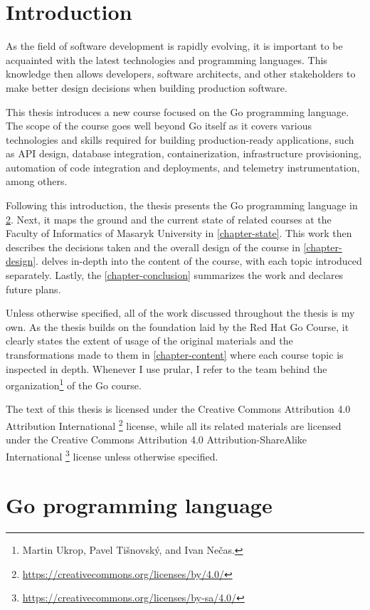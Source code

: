\documentclass[
  digital,
  color,
  oneside,
  nosansbold,
  nocolorbold,
  lof,
  nolot,
]{fithesis4}
\begin{document}
\chapter{Introduction}

As the field of software development is rapidly evolving, it is important to be acquainted with the latest technologies and programming languages. This knowledge then allows developers, software architects, and other stakeholders to make better design decisions when building production software.

This thesis introduces a new course focused on the Go\cite{go} programming language. The scope of the course goes well beyond Go itself as it covers various technologies and skills required for building production-ready applications, such as API design, database integration, containerization, infrastructure provisioning, automation of code integration and deployments, and telemetry instrumentation, among others.

Following this introduction, the thesis presents the Go programming language in \cref{chapter-go}. Next, it maps the ground and the current state of related courses at the Faculty of Informatics of Masaryk University in \cref{chapter-state}. This work then describes the decisions taken and the overall design of the course in \cref{chapter-design}.  delves in-depth into the content of the course, with each topic introduced separately. Lastly, the \cref{chapter-conclusion} summarizes the work and declares future plans.

Unless otherwise specified, all of the work discussed throughout the thesis is my own. As the thesis builds on the foundation laid by the Red Hat Go Course\cite{redhat-go-course}, it clearly states the extent of usage of the original materials and the transformations made to them in \cref{chapter-content} where each course topic is inspected in depth. Whenever I use prular, I refer to the team behind the organization\footnote{Martin Ukrop, Pavel Tišnovský, and Ivan Nečas.} of the Go course.

The text of this thesis is licensed under the Creative Commons Attribution 4.0 Attribution International \footnote{\url{https://creativecommons.org/licenses/by/4.0/}} license, while all its related materials are licensed under the Creative Commons Attribution 4.0 Attribution-ShareAlike International \footnote{\url{https://creativecommons.org/licenses/by-sa/4.0/}} license unless otherwise specified.

\chapter{Go programming language}\label{chapter-go}
\end{document}
